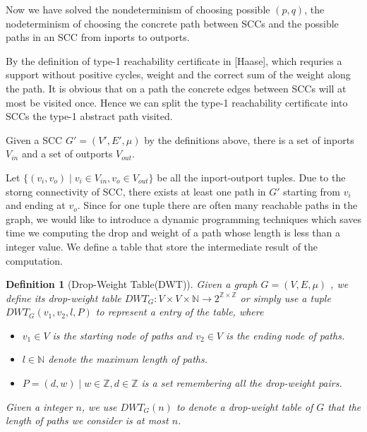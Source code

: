 \documentclass{article}
\newtheorem{definition}{Definition}
\begin{document}
\begin{itemize}
Now we have solved the nondeterminism of choosing possible $(p,q)$, the nodeterminism of choosing the concrete path between SCCs and the possible paths in an SCC from inports to outports. 



By the definition of type-1 reachability certificate in [Haase], which requries a support without positive cycles, weight and the correct sum of the weight along the path. It is obvious that on a path the concrete edges between SCCs will at most be visited once. Hence we can split the type-1 reachability certificate into SCCs the type-1 abstract path visited.


Given a SCC $G' = (V', E', \mu)$ by the definitions above, there is a set of inports $V_{in}$ and a set of outports $V_{out}$.

Let $\{(v_{i}, v_{o})\mid v_i\in V_{in}, v_o \in V_{out}\}$  be all the inport-outport tuples. Due to the storng connectivity of SCC, there exists at least one path in $G'$ starting from $v_i$ and ending at $v_o$. Since for one tuple there are often many reachable paths in the graph, we would like to introduce a dynamic programming techniques which saves time we computing the drop and weight of a path whose length is less than a integer value. We define a table that store the intermediate result of the computation.

\begin{definition}[Drop-Weight Table(DWT)]

Given a graph $G = (V, E, \mu)$ , we define its drop-weight table $DWT_{G}: V\times V\times \mathbb{N} \rightarrow 2^{\mathbb{Z}\times\mathbb{Z}}$ or simply use a tuple $DWT_{G}(v_1, v_2, l, P)$ to represent a entry of the table, where

\begin{itemize}
\item $v_1\in V$ is the starting node of  paths and $v_2\in V$ is the ending node of paths.

\item $l\in \mathbb{N}$ denote the maximum length of paths.

\item $P = {(d,w)\mid w\in \mathbb{Z}, d\in \mathbb{Z}}$ is a set remembering all the  drop-weight pairs.

\end{itemize}



Given a integer $n$, we use $DWT_{G}(n)$ to denote a drop-weight table of $G$ that the length of paths we consider is at most $n$.
\end{definition}



\end{itemize}
\end{document}
